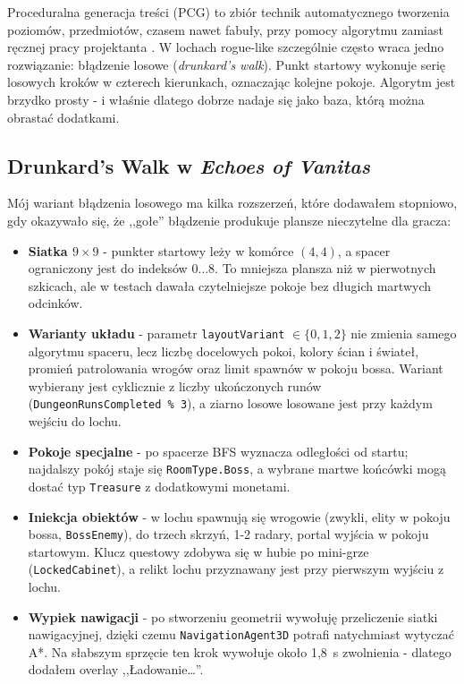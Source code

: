 Proceduralna generacja treści (PCG) to zbiór technik automatycznego tworzenia poziomów, przedmiotów, czasem nawet fabuły, przy pomocy algorytmu zamiast ręcznej pracy projektanta \cite{shaker2016pcg}. W lochach rogue-like szczególnie często wraca jedno rozwiązanie: błądzenie losowe (\textit{drunkard's walk}). Punkt startowy wykonuje serię losowych kroków w czterech kierunkach, oznaczając kolejne pokoje. Algorytm jest brzydko prosty - i właśnie dlatego dobrze nadaje się jako baza, którą można obrastać dodatkami.

\subsection{Drunkard's Walk w \textit{Echoes of Vanitas}}

Mój wariant błądzenia losowego ma kilka rozszerzeń, które dodawałem stopniowo, gdy okazywało się, że ,,gołe'' błądzenie produkuje plansze nieczytelne dla gracza:

\begin{itemize}
    \item \textbf{Siatka $9 \times 9$} - punkter startowy leży w komórce $(4,4)$, a spacer ograniczony jest do indeksów $0\ldots 8$. To mniejsza plansza niż w pierwotnych szkicach, ale w testach dawała czytelniejsze pokoje bez długich martwych odcinków.
    \item \textbf{Warianty układu} - parametr \texttt{layoutVariant} $\in \{0, 1, 2\}$ nie zmienia samego algorytmu spaceru, lecz liczbę docelowych pokoi, kolory ścian i świateł, promień patrolowania wrogów oraz limit spawnów w pokoju bossa. Wariant wybierany jest cyklicznie z liczby ukończonych runów (\texttt{DungeonRunsCompleted \% 3}), a ziarno losowe losowane jest przy każdym wejściu do lochu.
    \item \textbf{Pokoje specjalne} - po spacerze BFS wyznacza odległości od startu; najdalszy pokój staje się \texttt{RoomType.Boss}, a wybrane martwe końcówki mogą dostać typ \texttt{Treasure} z dodatkowymi monetami.
    \item \textbf{Iniekcja obiektów} - w lochu spawnują się wrogowie (zwykli, elity w pokoju bossa, \texttt{BossEnemy}), do trzech skrzyń, 1-2 radary, portal wyjścia w pokoju startowym. Klucz questowy zdobywa się w hubie po mini-grze (\texttt{LockedCabinet}), a relikt lochu przyznawany jest przy pierwszym wyjściu z lochu.
    \item \textbf{Wypiek nawigacji} - po stworzeniu geometrii wywołuję przeliczenie siatki nawigacyjnej, dzięki czemu \texttt{NavigationAgent3D} potrafi natychmiast wytyczać A*. Na słabszym sprzęcie ten krok wywołuje około 1,8~s zwolnienia - dlatego dodałem overlay ,,Ładowanie\ldots''.
\end{itemize}

